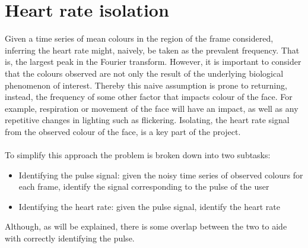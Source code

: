 \section{Heart rate isolation}
Given a time series of mean colours in the region of the frame considered, inferring the heart rate might, naively, be taken as the prevalent frequency. That is, the largest peak in the Fourier transform. However, it is important to consider that the colours observed are not only the result of the underlying biological phenomenon of interest. Thereby this naive assumption is prone to returning, instead, the frequency of some other factor that impacts colour of the face. For example, respiration or movement of the face will have an impact, as well as any repetitive changes in lighting such as flickering. Isolating, the heart rate signal from the observed colour of the face, is a key part of the project.
\\\\
To simplify this approach the problem is broken down into two subtasks:
\begin{itemize}
    \item Identifying the pulse signal: given the noisy time series of observed colours for each frame, identify the signal corresponding to the pulse of the user
    \item Identifying the heart rate: given the pulse signal, identify the heart rate
\end{itemize}
Although, as will be explained, there is some overlap between the two to aide with correctly identifying the pulse.

